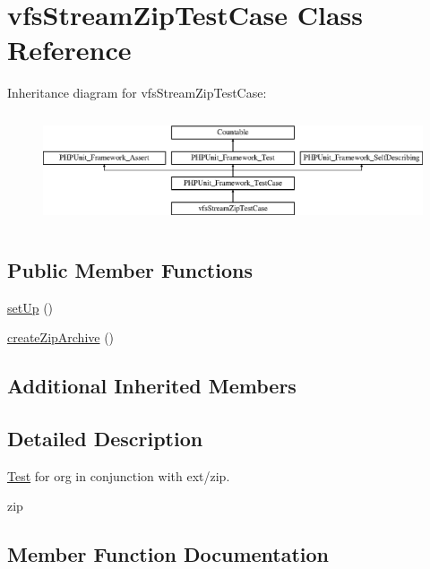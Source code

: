 \hypertarget{classorg_1_1bovigo_1_1vfs_1_1vfs_stream_zip_test_case}{}\section{vfs\+Stream\+Zip\+Test\+Case Class Reference}
\label{classorg_1_1bovigo_1_1vfs_1_1vfs_stream_zip_test_case}
Inheritance diagram for vfs\+Stream\+Zip\+Test\+Case\+:\begin{figure}[H]
\begin{center}
\leavevmode
\includegraphics[height=3.303835cm]{classorg_1_1bovigo_1_1vfs_1_1vfs_stream_zip_test_case}
\end{center}
\end{figure}
\subsection*{Public Member Functions}
\begin{DoxyCompactItemize}
\item 
\mbox{\hyperlink{classorg_1_1bovigo_1_1vfs_1_1vfs_stream_zip_test_case_a0bc688732d2b3b162ffebaf7812e78da}{set\+Up}} ()
\item 
\mbox{\hyperlink{classorg_1_1bovigo_1_1vfs_1_1vfs_stream_zip_test_case_a2dd7bef2a680a3470924f91d5f4c5ccf}{create\+Zip\+Archive}} ()
\end{DoxyCompactItemize}
\subsection*{Additional Inherited Members}


\subsection{Detailed Description}
\mbox{\hyperlink{class_test}{Test}} for org in conjunction with ext/zip.

zip 

\subsection{Member Function Documentation}
\mbox{\label{classorg_1_1bovigo_1_1vfs_1_1vfs_stream_zip_test_case_a2dd7bef2a680a3470924f91d5f4c5ccf}} 
